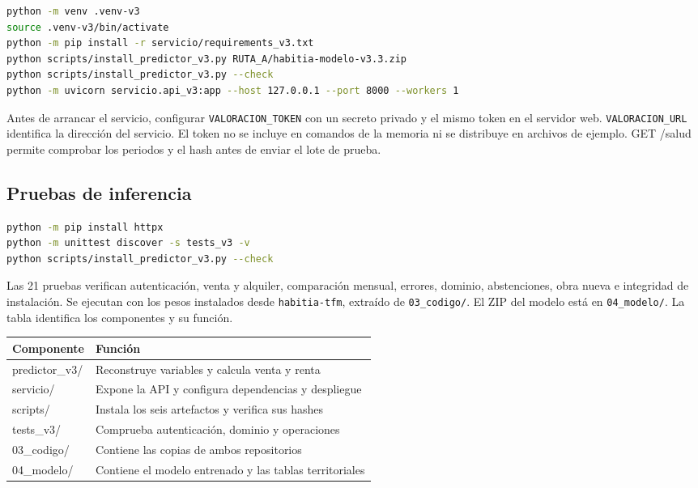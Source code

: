 \documentclass[11pt,a4paper]{article}
\newcommand{\thead}[1]{\textbf{#1}}
\newcounter{anexo}
\newcounter{anexosub}[anexo]
\begin{document}
\begin{lstlisting}[language=bash]
python -m venv .venv-v3
source .venv-v3/bin/activate
python -m pip install -r servicio/requirements_v3.txt
python scripts/install_predictor_v3.py RUTA_A/habitia-modelo-v3.3.zip
python scripts/install_predictor_v3.py --check
python -m uvicorn servicio.api_v3:app --host 127.0.0.1 --port 8000 --workers 1
\end{lstlisting}

Antes de arrancar el servicio, configurar \texttt{VALORACION\_TOKEN} con un secreto privado y el mismo token en el servidor web. \texttt{VALORACION\_URL} identifica la dirección del servicio. El token no se incluye en comandos de la memoria ni se distribuye en archivos de ejemplo. GET /salud permite comprobar los periodos y el hash antes de enviar el lote de prueba.

%
\subsection*{\theanexo\hspace{0.3em}\hspace{0.45em}Pruebas de inferencia}

\begin{lstlisting}[language=bash]
python -m pip install httpx
python -m unittest discover -s tests_v3 -v
python scripts/install_predictor_v3.py --check
\end{lstlisting}

Las 21 pruebas verifican autenticación, venta y alquiler, comparación mensual, errores, dominio, abstenciones, obra nueva e integridad de instalación. Se ejecutan con los pesos instalados desde \texttt{habitia-tfm}, extraído de \texttt{03\_codigo/}. El ZIP del modelo está en \texttt{04\_modelo/}. La tabla identifica los componentes y su función.

\begin{center}
\begin{tabularx}{\linewidth}{@{}l L@{}}
\toprule
\thead{Componente} & \thead{Función} \\
\midrule
predictor\_v3/ & Reconstruye variables y calcula venta y renta \\
servicio/ & Expone la API y configura dependencias y despliegue \\
scripts/ & Instala los seis artefactos y verifica sus hashes \\
tests\_v3/ & Comprueba autenticación, dominio y operaciones \\
03\_codigo/ & Contiene las copias de ambos repositorios \\
04\_modelo/ & Contiene el modelo entrenado y las tablas territoriales \\
\bottomrule
\end{tabularx}
\end{center}
\end{document}
